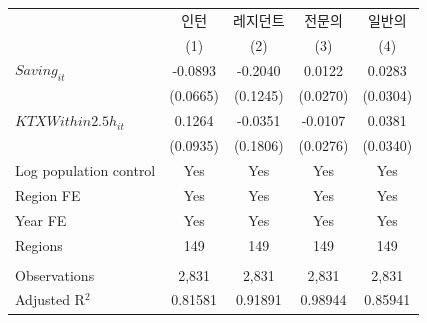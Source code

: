 \begingroup
\centering
\begin{tabular}{lcccc}
   \toprule
                          & 인턴     & 레지던트 & 전문의   & 일반의 \\   
                          & (1)      & (2)      & (3)      & (4)\\  
   \midrule 
   $Saving_{it}$          & -0.0893  & -0.2040  & 0.0122   & 0.0283\\   
                          & (0.0665) & (0.1245) & (0.0270) & (0.0304)\\   
   $KTXWithin2.5h_{it}$   & 0.1264   & -0.0351  & -0.0107  & 0.0381\\   
                          & (0.0935) & (0.1806) & (0.0276) & (0.0340)\\   
   Log population control & Yes      & Yes      & Yes      & Yes\\  
   Region FE              & Yes      & Yes      & Yes      & Yes\\  
   Year FE                & Yes      & Yes      & Yes      & Yes\\  
   Regions                & 149      & 149      & 149      & 149\\  
    \\
   Observations           & 2,831    & 2,831    & 2,831    & 2,831\\  
   Adjusted R$^2$         & 0.81581  & 0.91891  & 0.98944  & 0.85941\\  
   \bottomrule
\end{tabular}
\par\endgroup
